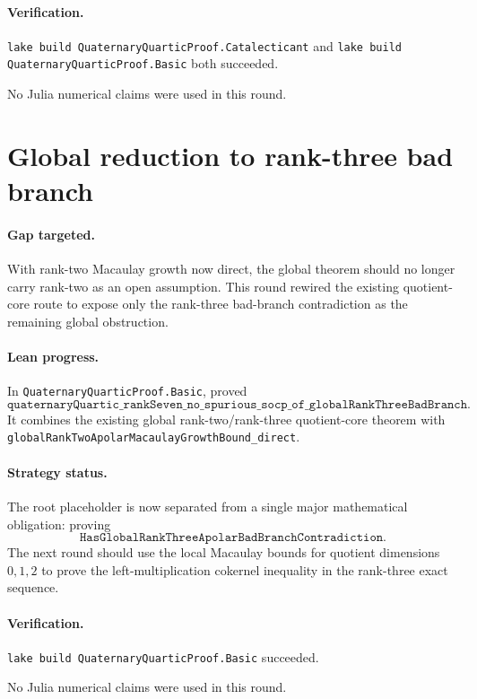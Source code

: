 \documentclass[11pt]{article}
\begin{document}
\paragraph{Verification.}
\texttt{lake build QuaternaryQuarticProof.Catalecticant} and
\texttt{lake build QuaternaryQuarticProof.Basic} both succeeded.

No Julia numerical claims were used in this round.

\section*{Global reduction to rank-three bad branch}

\paragraph{Gap targeted.}
With rank-two Macaulay growth now direct, the global theorem should no longer
carry rank-two as an open assumption.  This round rewired the existing
quotient-core route to expose only the rank-three bad-branch contradiction as
the remaining global obstruction.

\paragraph{Lean progress.}
In \texttt{QuaternaryQuarticProof.Basic}, proved
\[
\texttt{quaternaryQuartic\_rankSeven\_no\_spurious\_socp\_of\_globalRankThreeBadBranch}.
\]
It combines the existing global rank-two/rank-three quotient-core theorem
with \texttt{globalRankTwoApolarMacaulayGrowthBound\_direct}.

\paragraph{Strategy status.}
The root placeholder is now separated from a single major mathematical
obligation: proving
\[
\texttt{HasGlobalRankThreeApolarBadBranchContradiction}.
\]
The next round should use the local Macaulay bounds for quotient dimensions
\(0,1,2\) to prove the left-multiplication cokernel inequality in the
rank-three exact sequence.

\paragraph{Verification.}
\texttt{lake build QuaternaryQuarticProof.Basic} succeeded.

No Julia numerical claims were used in this round.
\end{document}
